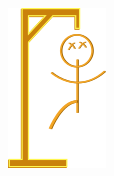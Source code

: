 \begin{figure}[ht]
\begin{subfigure}[b]{0.1\textwidth}
        \includegraphics[width=\textwidth]{./img/gui/hang5.png}
    \end{subfigure}
    \begin{subfigure}[b]{0.1\textwidth}

\end{subfigure}
\end{figure}

